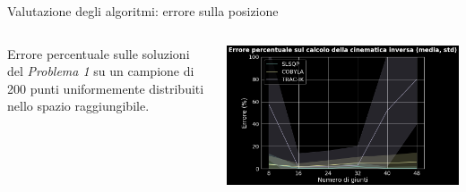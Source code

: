 \begin{frame}{Valutazione degli algoritmi: errore sulla posizione}
\begin{columns}
\begin{column}{0.3\textwidth}
Errore percentuale sulle soluzioni del \emph{Problema 1} su un campione di 200 punti uniformemente distribuiti nello spazio raggiungibile.
\end{column}
\begin{column}{0.7\textwidth}
\hspace*{-2em}\includegraphics[width=1.15\textwidth]{slide/img_cinematica_inversa/risultati_errore.png}
\end{column}
\end{columns}


\end{frame}

